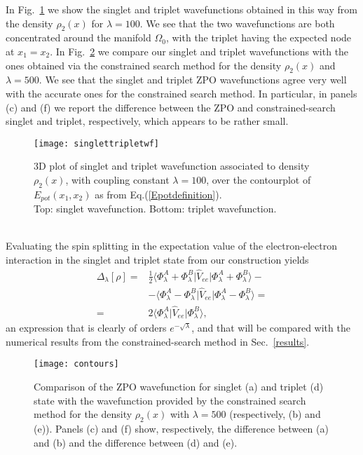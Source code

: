 \documentclass[aps,pra,twocolumn,superscriptaddress]{revtex4}
\begin{document}
In Fig.~\ref{lewf} we show the singlet and triplet wavefunctions obtained in this way from the density $\rho_2(x)$ for $\lambda=100$. We see that the two wavefunctions are both concentrated around the manifold $\Omega_0$, with the triplet having the expected node at $x_1=x_2$. In Fig.~\ref{constrainedsearchcomparison} we compare our singlet and triplet wavefunctions with the ones obtained via the constrained search method for the density $\rho_2(x)$ and $\lambda=500$. We see that the singlet and triplet ZPO wavefunctions agree very well with the accurate ones for the constrained search method. In particular, in panels (c) and (f) we report the difference between the ZPO and constrained-search singlet and triplet, respectively, which appears to be rather small.
\begin{figure}
\texttt{[image: singlettripletwf]}
\caption{\label{lewf}3D plot of singlet and triplet wavefunction associated to density $\rho_2(x)$, with coupling constant $\lambda=100$, over the contourplot of $E_{pot}(x_1,x_2)$ as from Eq.(\ref{Epotdefinition}).\\Top: singlet wavefunction. Bottom: triplet wavefunction.}
\end{figure} \\

Evaluating the spin splitting in the expectation value of the electron-electron interaction in the singlet and triplet state from our construction yields
\begin{equation}\label{splittingfromGVS}
\begin{aligned}
\Delta_{\lambda}[\rho]=&\frac{1}{2}\langle\Phi^A_{\lambda}+\Phi^B_{\lambda}\vert\hat{V}_{ee}\vert\Phi^A_{\lambda}+\Phi^B_{\lambda}\rangle-\\&-\langle\Phi^A_{\lambda}-\Phi^B_{\lambda}\vert\hat{V}_{ee}\vert\Phi^A_{\lambda}-\Phi^B_{\lambda}\rangle=\\=&2\langle\Phi^A_{\lambda}\vert\hat{V}_{ee}\vert\Phi^B_{\lambda}\rangle,
\end{aligned}
\end{equation}
an expression that is clearly of orders $e^{-\sqrt{\lambda}}$, and that will be compared with the numerical results from the constrained-search method in Sec.~\ref{results}.

\begin{figure}
\texttt{[image: contours]}
\caption{\label{constrainedsearchcomparison}Comparison of the ZPO wavefunction for singlet (a) and triplet (d) state with the wavefunction provided by the constrained search method for the density $\rho_2(x)$ with $\lambda=500$ (respectively, (b) and (e)). Panels (c) and (f) show, respectively, the difference between (a) and (b) and the difference between (d) and (e).}
\end{figure} 
\end{document}
